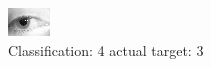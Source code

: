 \begin{figure}[h!]
\begin{center}
\includegraphics[width=0.60\columnwidth]{figures/ID1376_class_4_target_3.png}
\end{center}
\caption{ Classification: 4 actual target: 3}
\label{fig:ID1376_class_4_target_3}
\end{figure}
